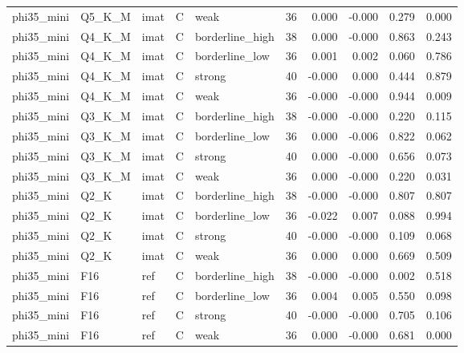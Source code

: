 \begin{tabular}{lllllrrrrr}
phi35\_mini & Q5\_K\_M & imat & C & weak & 36 & 0.000 & -0.000 & 0.279 & 0.000 \\
phi35\_mini & Q4\_K\_M & imat & C & borderline\_high & 38 & 0.000 & -0.000 & 0.863 & 0.243 \\
phi35\_mini & Q4\_K\_M & imat & C & borderline\_low & 36 & 0.001 & 0.002 & 0.060 & 0.786 \\
phi35\_mini & Q4\_K\_M & imat & C & strong & 40 & -0.000 & 0.000 & 0.444 & 0.879 \\
phi35\_mini & Q4\_K\_M & imat & C & weak & 36 & -0.000 & -0.000 & 0.944 & 0.009 \\
phi35\_mini & Q3\_K\_M & imat & C & borderline\_high & 38 & -0.000 & -0.000 & 0.220 & 0.115 \\
phi35\_mini & Q3\_K\_M & imat & C & borderline\_low & 36 & 0.000 & -0.006 & 0.822 & 0.062 \\
phi35\_mini & Q3\_K\_M & imat & C & strong & 40 & 0.000 & -0.000 & 0.656 & 0.073 \\
phi35\_mini & Q3\_K\_M & imat & C & weak & 36 & 0.000 & -0.000 & 0.220 & 0.031 \\
phi35\_mini & Q2\_K & imat & C & borderline\_high & 38 & -0.000 & -0.000 & 0.807 & 0.807 \\
phi35\_mini & Q2\_K & imat & C & borderline\_low & 36 & -0.022 & 0.007 & 0.088 & 0.994 \\
phi35\_mini & Q2\_K & imat & C & strong & 40 & -0.000 & -0.000 & 0.109 & 0.068 \\
phi35\_mini & Q2\_K & imat & C & weak & 36 & 0.000 & 0.000 & 0.669 & 0.509 \\
phi35\_mini & F16 & ref & C & borderline\_high & 38 & -0.000 & -0.000 & 0.002 & 0.518 \\
phi35\_mini & F16 & ref & C & borderline\_low & 36 & 0.004 & 0.005 & 0.550 & 0.098 \\
phi35\_mini & F16 & ref & C & strong & 40 & -0.000 & -0.000 & 0.705 & 0.106 \\
phi35\_mini & F16 & ref & C & weak & 36 & 0.000 & -0.000 & 0.681 & 0.000 \\
\bottomrule
\end{tabular}
